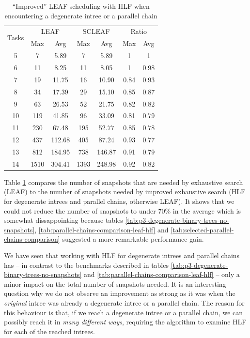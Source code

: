 \begin{table}[th]
  \centering
  \begin{tabular}[ht]{ccccccc}
    \multirow{2}{*}{Tasks} & \multicolumn{2}{c}{LEAF} & \multicolumn{2}{c}{SCLEAF} & \multicolumn{2}{c}{Ratio}\\
    &  Max & Avg & Max & Avg & Max & Avg\\
    \hline
    5 & 7 & 5.89 & 7 & 5.89 & 1 & 1\\
    6 & 11 & 8.25 & 11 & 8.05 & 1 & 0.98 \\
    7 & 19 & 11.75 & 16 & 10.90 & 0.84 & 0.93 \\
    8 & 34 & 17.39 & 29 & 15.10 & 0.85 & 0.87 \\
    9 & 63 & 26.53 & 52 & 21.75 & 0.82 & 0.82 \\
    10 & 119 & 41.85 & 96 & 33.09 & 0.81 & 0.79 \\
    11 & 230 & 67.48 & 195 & 52.77 & 0.85 & 0.78 \\
    12 & 437 & 112.68 & 405 & 87.24 & 0.93 & 0.77 \\
    13 & 812 & 184.95 & 738 & 146.87 & 0.91 & 0.79 \\
    14 & 1510 & 304.41 & 1393 & 248.98 & 0.92 & 0.82
  \end{tabular}
  \caption{``Improved'' LEAF scheduling with HLF when encountering a degenerate intree or a parallel chain}
  \label{tab:improving-leaf-scheduler-benchmark}
\end{table}

Table \ref{tab:improving-leaf-scheduler-benchmark} compares the number of snapshots that are needed by exhaustive search (LEAF) to the number of snapshots needed by improved exhaustive search (HLF for degenerate intrees and parallel chains, otherwise LEAF). It shows that we could not reduce the number of snapshots to under 70\% in the average which is somewhat dissappointing because tables \ref{tab:p3-degenerate-binary-trees-no-snapshots}, \ref{tab:parallel-chains-comparison-leaf-hlf} and \ref{tab:selected-parallel-chains-comparison} suggested a more remarkable performance gain.

We have seen that working with HLF for degenerate intrees and parallel chains has -- in contrast to the benchmarks described in tables \ref{tab:p3-degenerate-binary-trees-no-snapshots} and \ref{tab:parallel-chains-comparison-leaf-hlf} -- only a minor impact on the total number of snapshots needed. It is an interesting question why we do not observe an improvement as strong as it was when the \emph{original} intree was already a degenerate intree or a parallel chain. The reason for this behaviour is that, if we reach a degenerate intree or a parallel chain, we can possibly reach it in \emph{many different ways}, requiring the algorithm to examine HLF for each of the reached intrees. 

